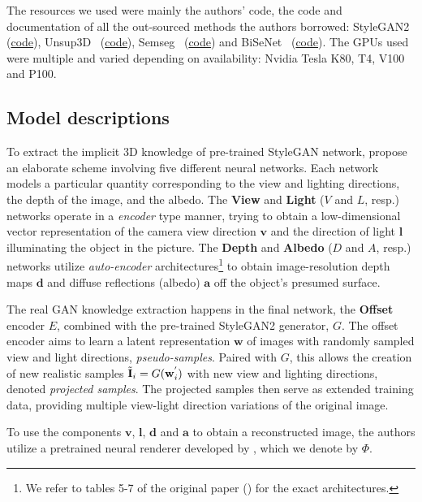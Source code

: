 The resources we used were mainly the authors' code, the code and documentation of all the out-sourced methods the authors borrowed: StyleGAN2~\cite{stylegan2} (\href{https://github.com/rosinality/stylegan2-pytorch}{code}), Unsup3D~\cite{wu2020unsupervised} (\href{https://github.com/elliottwu/unsup3d}{code}), Semseg~\cite{semseg2019} (\href{https://github.com/hszhao/semseg}{code}) and BiSeNet~\cite{bisenet, bisenet2} (\href{https://github.com/zllrunning/face-parsing.PyTorch}{code}). The GPUs used were multiple and varied depending on availability: Nvidia Tesla K80, T4, V100 and P100.

\subsection{Model descriptions}
To extract the implicit 3D knowledge of pre-trained StyleGAN network, \textcite{gan2shape} propose an elaborate scheme involving five different neural networks. Each network models a particular quantity corresponding to the view and lighting directions, the depth of the image, and the albedo. The \textbf{View} and \textbf{Light} ($V$ and $L$, resp.) networks operate in a \textit{encoder} type manner, trying to obtain a low-dimensional vector representation of the camera view direction $\textbf{v}$ and the direction of light $\textbf{l}$ illuminating the object in the picture. 
The \textbf{Depth} and \textbf{Albedo} ($D$ and $A$, resp.) networks utilize \textit{auto-encoder} architectures\footnote{We refer to tables 5-7 of the original paper (\cite{gan2shape}) for the exact architectures.} to obtain image-resolution depth maps $\textbf{d}$ and diffuse reflections (albedo) $\textbf{a}$ off the object's presumed surface.

The real GAN knowledge extraction happens in the final network, the \textbf{Offset} encoder $E$, combined with the pre-trained StyleGAN2 generator, $G$. The offset encoder aims to learn a latent representation $\textbf{w}$ of images with randomly sampled view and light directions, \textit{pseudo-samples}.
Paired with $G$, this allows the creation of new realistic samples $\Tilde{\textbf{I}}_i = G(\textbf{w}^{'}_{i})$ with new view and lighting directions, denoted \textit{projected samples}.
The projected samples then serve as extended training data, providing multiple view-light direction variations of the original image.

To use the components $\textbf{v}$, $\textbf{l}$, $\textbf{d}$ and $\textbf{a}$ to obtain a reconstructed image, the authors utilize a pretrained neural renderer developed by \textcite{neural-renderer}, which we denote by $\Phi$.

